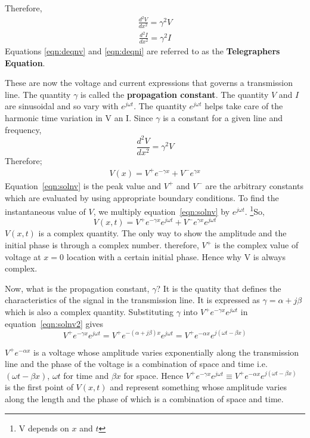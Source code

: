 Therefore, 
\begin{align}
\frac{d^{2}V}{dx^{2}} = \gamma^{2}V 
\label{eqn:deqnv}
\end{align}
\begin{align}
\frac{d^{2}I}{dx^{2}} = \gamma^{2}I 
\label{eqn:deqni}
\end{align}
Equations \ref{eqn:deqnv} and \ref{eqn:deqni} are referred to as the \textbf{Telegraphers Equation}.

These are now the voltage and current expressions that governs a transmission line. The quantity $ \gamma $ is called the \textbf{propagation constant}. The quantity $V$ and $I$ are sinusoidal and so vary with $e^{j\omega t}$. The quantity $ e ^{j\omega t} $ helps take care of the harmonic time variation in V an I. 
Since $ \gamma $ is a constant for a given line and frequency, 
\[ \frac{d^{2}V}{dx^{2}} = \gamma^{2}V\]
Therefore; 
\begin{align}
V(x) = V^{+} e ^{- \gamma x} + V^{-}e^{\gamma x}  
\label{eqn:solnv}
\end{align}
Equation~\eqref{eqn:solnv} is the peak value and $V^+$ and $V^-$ are the arbitrary constants which are evaluated by using appropriate boundary conditions. To find the instantaneous value of $V$, we multiply equation~\eqref{eqn:solnv} by $e^{j\omega t}$. \footnote{V depends on $x$ and $t$}So,
\begin{dmath}
V(x,t) = V^{+} e^{-\gamma x}e^{j\omega t} + V^{-} e^{\gamma x}e^{j\omega t}
\label{eqn:solnv2}
\end{dmath}
$V(x,t)$ is a complex quantity. The only way to show the amplitude and the initial phase is through a complex number. therefore, $ V^{+}$ is the complex value of voltage at $x=0$ location with a certain initial phase. Hence why V is always complex. 

Now, what is the propagation constant, $\gamma$? It is the quatity that defines the characteristics of the signal in the transmission line. It is expressed as $ \gamma = \alpha + j\beta $	 which is also a complex quantity. Substituting $\gamma$ into $V^{+}e^{- \gamma x}e^{j \omega t}$ in equation~\eqref{eqn:solnv2} gives
\begin{dmath}
V^{+}e^{- \gamma x}e^{j \omega t} = V^{+}e^{-( \alpha + j \beta )x}e^{j \omega t} = V^{+}e^{-\alpha x}e^{j(\omega t - \beta x)}
\end{dmath}

$ V^{+}e^{-\alpha x} $ is a voltage whose amplitude varies exponentially along the transmission line and the phase of the voltage is a combination of space and time i.e. $  (\omega t- \beta x) $, $ \omega t $ for time and $ \beta x  $ for space. Hence $ V^{+}e^{-\gamma x}e^{j\omega t} \equiv V^{+}e^{-\alpha x}e^{j( \omega t-\beta x)} $ is the first point of $V(x,t)$ and represent something whose amplitude varies along the length and the phase of which is a combination of space and time.

